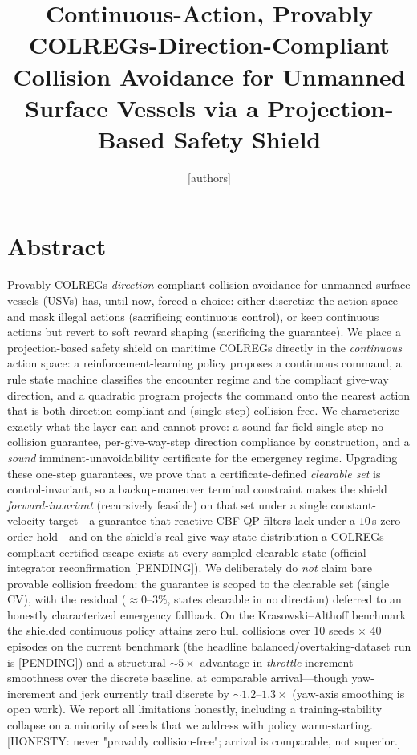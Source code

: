 \documentclass[12pt,letterpaper]{article}
\title{Continuous-Action, Provably COLREGs-Direction-Compliant
Collision Avoidance for Unmanned Surface Vessels via a
Projection-Based Safety Shield}
\author{[authors]}
\date{}
\theoremstyle{remark}\newtheorem*{scope}{Scope and honest limits}
\begin{document}
\maketitle

\section{Abstract}
Provably COLREGs-\emph{direction}-compliant collision avoidance for unmanned
surface vessels (USVs) has, until now, forced a choice: either discretize the
action space and mask illegal actions (sacrificing continuous control), or keep
continuous actions but revert to soft reward shaping (sacrificing the guarantee).
We place a projection-based safety shield on maritime COLREGs directly in the
\emph{continuous} action space: a reinforcement-learning policy proposes a
continuous command, a rule state machine classifies the encounter regime and the
compliant give-way direction, and a quadratic program projects the command onto
the nearest action that is both direction-compliant and (single-step)
collision-free. We characterize exactly what the layer can and cannot prove: a
sound far-field single-step no-collision guarantee, per-give-way-step direction
compliance by construction, and a \emph{sound} imminent-unavoidability certificate
for the emergency regime. Upgrading these one-step guarantees, we prove that a
certificate-defined \emph{clearable set} is control-invariant, so a backup-maneuver
terminal constraint makes the shield \emph{forward-invariant} (recursively feasible)
on that set under a single constant-velocity target---a guarantee that reactive
CBF-QP filters lack under a $10$\,s zero-order hold---and on the shield's real
give-way state distribution a COLREGs-compliant certified escape exists at every
sampled clearable state (official-integrator reconfirmation [PENDING]). We deliberately
do \emph{not} claim bare provable collision freedom:
the guarantee is scoped to the clearable set (single CV), with the residual
($\approx\!0$--$3\%$, states clearable in no direction) deferred to an honestly
characterized emergency fallback. On the Krasowski--Althoff benchmark the shielded continuous policy attains
zero hull collisions over $10$ seeds $\times$ $40$ episodes on the current benchmark
(the headline balanced/overtaking-dataset run is [PENDING]) and a structural
$\sim\!5\times$ advantage in \emph{throttle}-increment smoothness over the discrete
baseline, at comparable arrival---though yaw-increment and jerk currently trail discrete
by $\sim\!1.2$--$1.3\times$ (yaw-axis smoothing is open work). We report all limitations
honestly, including a
training-stability collapse on a minority of seeds that we address with
policy warm-starting. [HONESTY: never "provably collision-free"; arrival is
comparable, not superior.]
\end{document}
